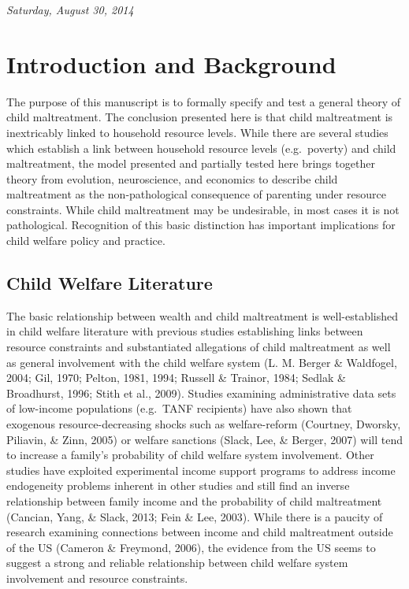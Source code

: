 \documentclass[]{elsarticle}
\author{}
\date{Saturday, August 30, 2014}
\begin{document}
\begin{center}
\large \emph{Saturday, August 30, 2014} \\
\end{center}
\normalsize


\section{Introduction and Background}\label{introduction-and-background}

The purpose of this manuscript is to formally specify and test a general
theory of child maltreatment. The conclusion presented here is that
child maltreatment is inextricably linked to household resource levels.
While there are several studies which establish a link between household
resource levels (e.g.~poverty) and child maltreatment, the model
presented and partially tested here brings together theory from
evolution, neuroscience, and economics to describe child maltreatment as
the non-pathological consequence of parenting under resource
constraints. While child maltreatment may be undesirable, in most cases
it is not pathological. Recognition of this basic distinction has
important implications for child welfare policy and practice.

\subsection{Child Welfare Literature}\label{child-welfare-literature}

The basic relationship between wealth and child maltreatment is
well-established in child welfare literature with previous studies
establishing links between resource constraints and substantiated
allegations of child maltreatment as well as general involvement with
the child welfare system (L. M. Berger \& Waldfogel, 2004; Gil, 1970;
Pelton, 1981, 1994; Russell \& Trainor, 1984; Sedlak \& Broadhurst,
1996; Stith et al., 2009). Studies examining administrative data sets of
low-income populations (e.g.~TANF recipients) have also shown that
exogenous resource-decreasing shocks such as welfare-reform (Courtney,
Dworsky, Piliavin, \& Zinn, 2005) or welfare sanctions (Slack, Lee, \&
Berger, 2007) will tend to increase a family's probability of child
welfare system involvement. Other studies have exploited experimental
income support programs to address income endogeneity problems inherent
in other studies and still find an inverse relationship between family
income and the probability of child maltreatment (Cancian, Yang, \&
Slack, 2013; Fein \& Lee, 2003). While there is a paucity of research
examining connections between income and child maltreatment outside of
the US (Cameron \& Freymond, 2006), the evidence from the US seems to
suggest a strong and reliable relationship between child welfare system
involvement and resource constraints.
\end{document}
